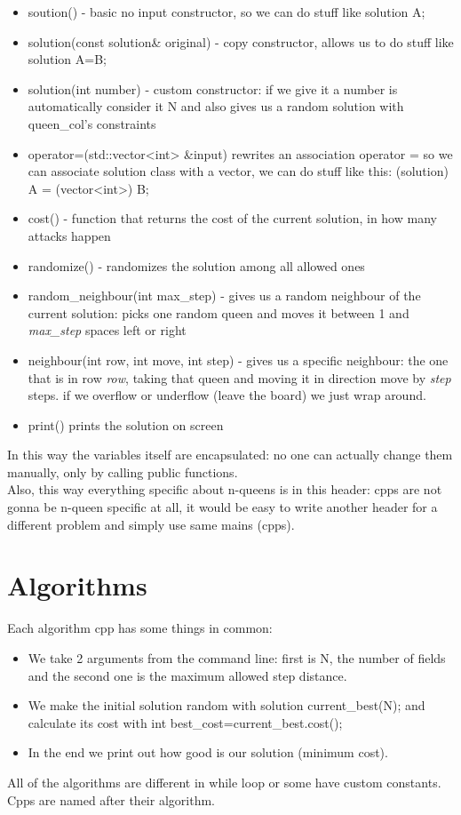 \documentclass[10pt,a4paper]{article}
\begin{document}
			\begin{itemize}
				\item soution() - basic no input constructor, so we can do stuff like solution A;
				\item solution(const solution\& original) - copy constructor, allows us to do stuff like solution A=B;
				\item solution(int number) - custom constructor: if we give it a number is automatically consider it N and also gives us a random solution with queen\_col's constraints
				\item operator=(std::vector<int> \&input) rewrites an association operator = so we can associate solution class with a vector, we can do stuff like this: (solution) A = (vector<int>) B;
				\item cost() - function that returns the cost of the current solution, in how many attacks happen
				\item randomize() - randomizes the solution among all allowed ones
				\item random\_neighbour(int max\_step) - gives us a random neighbour of the current solution: picks one random queen and moves it between 1 and \textit{max\_step} spaces left or right
				\item neighbour(int row, int move, int step) - gives us a specific neighbour: the one that is in row \textit{row}, taking that queen and moving it in direction move by \textit{step} steps. if we overflow or underflow (leave the board) we just wrap around.
				\item print() prints the solution on screen
			\end{itemize}
			In this way the variables itself are encapsulated: no one can actually change them manually, only by calling public functions. \\
			Also, this way everything specific about n-queens is in this header: cpps are not gonna be n-queen specific at all, it would be easy to write another header for a different problem and simply use same mains (cpps).
	\pagebreak
	\section{Algorithms}
		Each algorithm cpp has some things in common:
		\begin{itemize}
			\item We take 2 arguments from the command line: first is N, the number of fields and the second one is the maximum allowed step distance. \\
			\item We make the initial solution random with solution current\_best(N); and calculate its cost with int best\_cost=current\_best.cost();
			\item In the end we print out how good is our solution (minimum cost).
		\end{itemize}
		All of the algorithms are different in while loop or some have custom constants.\\
		Cpps are named after their algorithm.
\end{document}
